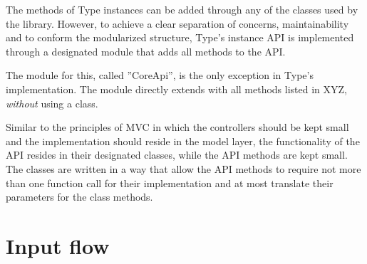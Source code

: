 The methods of Type instances can be added through any of the classes used by the library. However, to achieve a clear separation of concerns, maintainability and to conform the modularized structure, Type's instance API is implemented through a designated module that adds all methods to the API.

The module for this, called ''CoreApi'', is the only exception in Type's implementation. The module directly extends  with all methods listed in XYZ, \textit{without} using a class.

Similar to the principles of MVC in which the controllers should be kept small and the implementation should reside in the model layer, the functionality of the API resides in their designated classes, while the API methods are kept small. The classes are written in a way that allow the API methods to require not more than one function call for their implementation and at most translate their parameters for the class methods.





\section{Input flow}
\label{sec:module_architecture}



